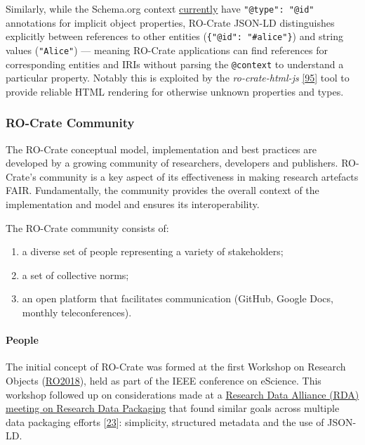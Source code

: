 Similarly, while the Schema.org context
\href{https://schema.org/version/13.0/schemaorg-current-http.jsonld}{currently}
have \texttt{"@type":\ "@id"} annotations for implicit object
properties, RO-Crate JSON-LD distinguishes explicitly between references
to other entities (\texttt{\{"@id":\ "\#alice"\}}) and string values
(\texttt{"Alice"}) --- meaning RO-Crate applications can find references
for corresponding entities and IRIs without parsing the
\texttt{@context} to understand a particular property. Notably this is
exploited by the \emph{ro-crate-html-js}
\href{https://www.npmjs.com/package/ro-crate-html-js}{{[}95{]}} tool to
provide reliable HTML rendering for otherwise unknown properties and
types.

\hypertarget{community}{%
\subsubsection{RO-Crate Community}\label{community}}

The RO-Crate conceptual model, implementation and best practices are
developed by a growing community of researchers, developers and
publishers. RO-Crate's community is a key aspect of its effectiveness in
making research artefacts FAIR. Fundamentally, the community provides
the overall context of the implementation and model and ensures its
interoperability.

The RO-Crate community consists of:

\begin{enumerate}
\def\labelenumi{\arabic{enumi}.}
\tightlist
\item
  a diverse set of people representing a variety of stakeholders;
\item
  a set of collective norms;
\item
  an open platform that facilitates communication (GitHub, Google Docs,
  monthly teleconferences).
\end{enumerate}

\hypertarget{people}{%
\paragraph{People}\label{people}}

The initial concept of RO-Crate was formed at the first Workshop on
Research Objects
(\href{https://www.researchobject.org/ro2018/}{RO2018}), held as part of
the IEEE conference on eScience. This workshop followed up on
considerations made at a
\href{https://rd-alliance.org/approaches-research-data-packaging-rda-11th-plenary-bof-meeting}{Research
Data Alliance (RDA) meeting on Research Data Packaging} that found
similar goals across multiple data packaging efforts
{[}\href{https://doi.org/10.5281/zenodo.3250687}{23}{]}: simplicity,
structured metadata and the use of JSON-LD.

